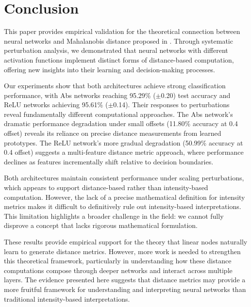 \section{Conclusion}

This paper provides empirical validation for the theoretical connection between neural networks and Mahalanobis distance proposed in \citep{oursland2024interpreting}. Through systematic perturbation analysis, we demonstrated that neural networks with different activation functions implement distinct forms of distance-based computation, offering new insights into their learning and decision-making processes.

Our experiments show that both architectures achieve strong classification performance, with Abs networks reaching 95.29\% ($\pm$0.20) test accuracy and ReLU networks achieving 95.61\% ($\pm$0.14). Their responses to perturbations reveal fundamentally different computational approaches. The Abs network's dramatic performance degradation under small offsets (11.80\% accuracy at 0.4 offset) reveals its reliance on precise distance measurements from learned prototypes. The ReLU network's more gradual degradation (50.99\% accuracy at 0.4 offset) suggests a multi-feature distance metric approach, where performance declines as features incrementally shift relative to decision boundaries.

Both architectures maintain consistent performance under scaling perturbations, which appears to support distance-based rather than intensity-based computation. However, the lack of a precise mathematical definition for intensity metrics makes it difficult to definitively rule out intensity-based interpretations. This limitation highlights a broader challenge in the field: we cannot fully disprove a concept that lacks rigorous mathematical formulation.

These results provide empirical support for the theory that linear nodes naturally learn to generate distance metrics. However, more work is needed to strengthen this theoretical framework, particularly in understanding how these distance computations compose through deeper networks and interact across multiple layers. The evidence presented here suggests that distance metrics may provide a more fruitful framework for understanding and interpreting neural networks than traditional intensity-based interpretations.
